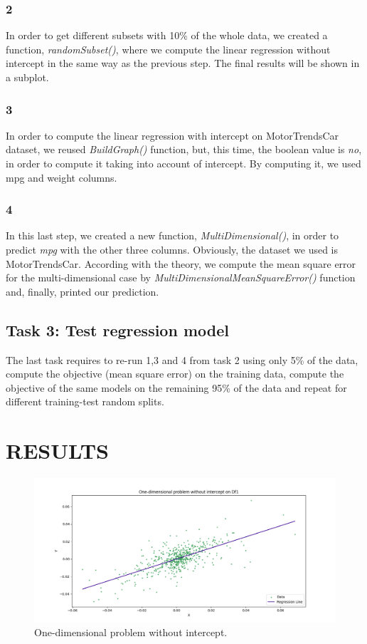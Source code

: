 \documentclass[10pt]{article}
\begin{document}
\subsubsection{2}
In order to get different subsets with 10\% of the whole data, we created a function, \textit{randomSubset()}, where we compute the linear regression without intercept in the same way as the previous step. The final results will be shown in a subplot.
\subsubsection{3}
In order to compute the linear regression with intercept on MotorTrendsCar dataset, we reused \textit{BuildGraph()} function, but, this time, the boolean value is \textit{no}, in order to compute it taking into account of intercept.
By computing it, we used mpg and weight columns.
\subsubsection{4}
In this last step, we created a new function, \textit{MultiDimensional()}, in order to predict \textit{mpg} with the other three columns. Obviously, the dataset we used is MotorTrendsCar.
According with the theory, we compute the mean square error for the multi-dimensional case by \textit{MultiDimensionalMeanSquareError()} function and, finally, printed our prediction.


\subsection{Task 3: Test regression model}
The last task requires to re-run 1,3 and 4 from task 2 using only 5\% of the data, compute the objective (mean square error) on the training data, compute the objective of the same models on the remaining 95\% of the data and repeat for different training-test random splits.

\section{RESULTS}

\begin{figure}[h] 
	\centering
	\includegraphics[width=0.9\columnwidth]{Figure_1.png} %
	\caption{One-dimensional problem without intercept.}
\end{figure}
\end{document}
